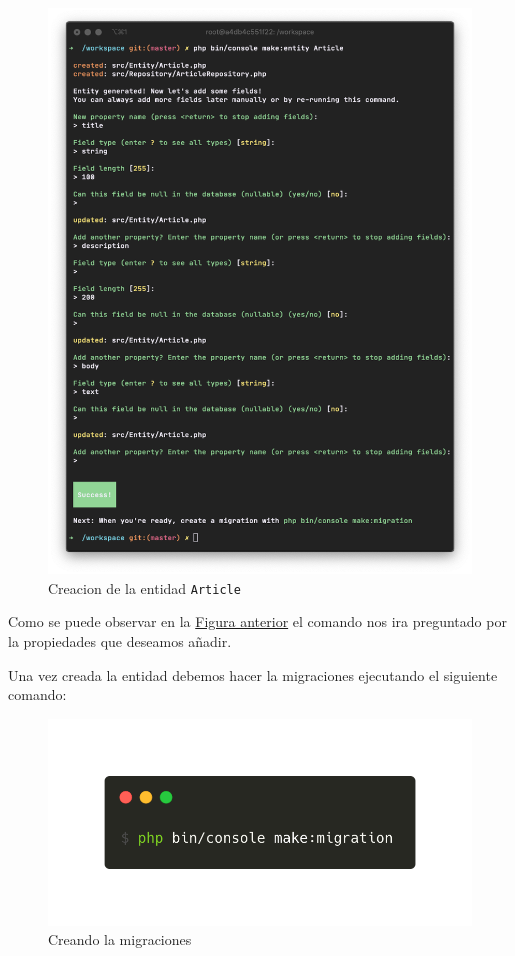 \begin{figure}[ht]
  \centering
  \includegraphics[width=\textwidth]{../assets/creation_article_entity.png}
  \caption{Creacion de la entidad \texttt{Article}}
  \label{fig:creation_article_entity}
\end{figure}
\clearpage

Como se puede observar en la \href{fig:creation_article_entity}{Figura anterior} el comando nos ira preguntado por la propiedades que deseamos añadir.

Una vez creada la entidad debemos hacer la migraciones ejecutando el siguiente comando:

\begin{figure}[ht]
  \centering
  \includegraphics[width=\textwidth]{../assets/make_migration.png}
  \caption{Creando la migraciones}
  \label{fig:make_migration}
\end{figure}

